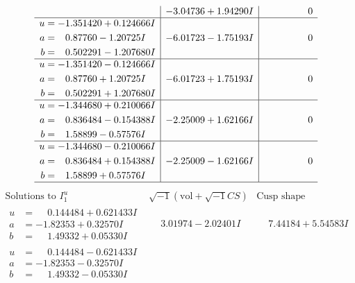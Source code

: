 \documentclass[1p]{elsarticle_modified}
\theoremstyle{definition}
\newcommand{\I}{\sqrt{-1}}
\begin{document}
$$\begin{array}{c|c|c}
 & -3.04736 + 1.94290 I & \phantom{-0.000000 } 0 \\ \hline\begin{aligned}
u &= -1.351420 + 0.124666 I \\
a &= \phantom{-}0.87760 - 1.20725 I \\
b &= \phantom{-}0.502291 - 1.207680 I\end{aligned}
 & -6.01723 - 1.75193 I & \phantom{-0.000000 } 0 \\ \hline\begin{aligned}
u &= -1.351420 - 0.124666 I \\
a &= \phantom{-}0.87760 + 1.20725 I \\
b &= \phantom{-}0.502291 + 1.207680 I\end{aligned}
 & -6.01723 + 1.75193 I & \phantom{-0.000000 } 0 \\ \hline\begin{aligned}
u &= -1.344680 + 0.210066 I \\
a &= \phantom{-}0.836484 - 0.154388 I \\
b &= \phantom{-}1.58899 - 0.57576 I\end{aligned}
 & -2.25009 + 1.62166 I & \phantom{-0.000000 } 0 \\ \hline\begin{aligned}
u &= -1.344680 - 0.210066 I \\
a &= \phantom{-}0.836484 + 0.154388 I \\
b &= \phantom{-}1.58899 + 0.57576 I\end{aligned}
 & -2.25009 - 1.62166 I & \phantom{-0.000000 } 0\\
 \hline 
 \end{array}$$\newpage$$\begin{array}{c|c|c}  
\text{Solutions to }I^u_{1}& \I (\text{vol} + \sqrt{-1}CS) & \text{Cusp shape}\\
 \hline 
\begin{aligned}
u &= \phantom{-}0.144484 + 0.621433 I \\
a &= -1.82353 + 0.32570 I \\
b &= \phantom{-}1.49332 + 0.05330 I\end{aligned}
 & \phantom{-}3.01974 - 2.02401 I & \phantom{-}7.44184 + 5.54583 I \\ \hline\begin{aligned}
u &= \phantom{-}0.144484 - 0.621433 I \\
a &= -1.82353 - 0.32570 I \\
b &= \phantom{-}1.49332 - 0.05330 I\end{aligned}

\end{array}$$
\end{document}
